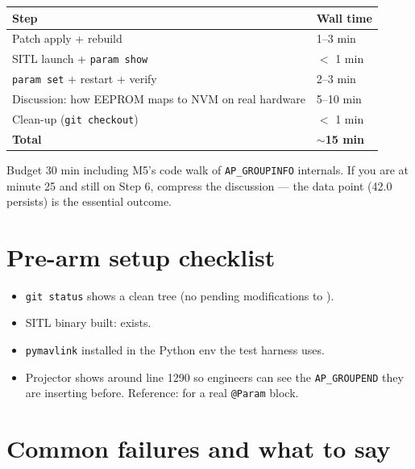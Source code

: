 \documentclass[a4paper,11pt,twoside]{article}
\begin{document}
\begin{center}\small
\begin{tabular}{|p{6cm}|p{4cm}|}\hline
\textbf{Step} & \textbf{Wall time} \\ \hline
Patch apply + rebuild & 1--3 min \\ \hline
SITL launch + \texttt{param show} & $<$ 1 min \\ \hline
\texttt{param set} + restart + verify & 2--3 min \\ \hline
Discussion: how EEPROM maps to NVM on real hardware & 5--10 min \\ \hline
Clean-up (\texttt{git checkout}) & $<$ 1 min \\ \hline
\textbf{Total} & \textbf{$\sim$15 min} \\ \hline
\end{tabular}
\end{center}

Budget 30 min including M5's code walk of \texttt{AP\_GROUPINFO} internals. If you are at minute 25 and still on Step 6, compress the discussion --- the data point (42.0 persists) is the essential outcome.

\section*{Pre-arm setup checklist}

\begin{itemize}[label={[ ]}]
  \item \texttt{git status} shows a clean tree (no pending modifications to ).
  \item SITL binary built:  exists.
  \item \texttt{pymavlink} installed in the Python env the test harness uses.
  \item Projector shows  around line 1290 so engineers can see the \texttt{AP\_GROUPEND} they are inserting before. Reference:  for a real \texttt{@Param} block.
\end{itemize}

\section*{Common failures and what to say}
\end{document}
